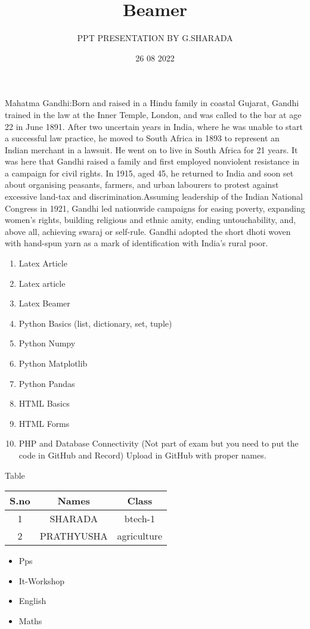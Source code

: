 \documentclass{beamer}
\title{Beamer}
\author{ PPT PRESENTATION BY G.SHARADA}
\date{26 08 2022}
\begin{document}
\maketitle
\begin{frame}Mahatma Gandhi:Born and raised in a Hindu family in coastal Gujarat, Gandhi trained in the law at the Inner Temple, London, and was called to the bar at age 22 in June 1891. After two uncertain years in India, where he was unable to start a successful law practice, he moved to South Africa in 1893 to represent an Indian merchant in a lawsuit. He went on to live in South Africa for 21 years. It was here that Gandhi raised a family and first employed nonviolent resistance in a campaign for civil rights. In 1915, aged 45, he returned to India and soon set about organising peasants, farmers, and urban labourers to protest against excessive land-tax and discrimination.Assuming leadership of the Indian National Congress in 1921, Gandhi led nationwide campaigns for easing poverty, expanding women's rights, building religious and ethnic amity, ending untouchability, and, above all, achieving swaraj or self-rule. Gandhi adopted the short dhoti woven with hand-spun yarn as a mark of identification with India's rural poor. 

\end{frame}
\begin{frame}
\begin{enumerate}
\item Latex Article
\item Latex article
\item Latex Beamer 
\item Python Basics (list, dictionary, set, tuple)
\item Python Numpy
\item Python Matplotlib
\item Python Pandas
\item HTML Basics
\item HTML Forms
\item PHP and Database Connectivity (Not part of exam but you need to put the code in GitHub and Record)
Upload in GitHub with proper names.
\end{enumerate}
\end{frame}
\begin{frame}{Table}
   \begin{tabular}{|c|c|c|}
 \hline
S.no & Names & Class\\
\hline
1 & SHARADA & btech-1 \\
\hline
2 & PRATHYUSHA & agriculture\\
\hline
   \end{tabular} 
\end{frame}
\begin{itemize}
    \item Pps
    \item It-Workshop
    \item English
    \item Maths
\end{itemize}
\end{document}
